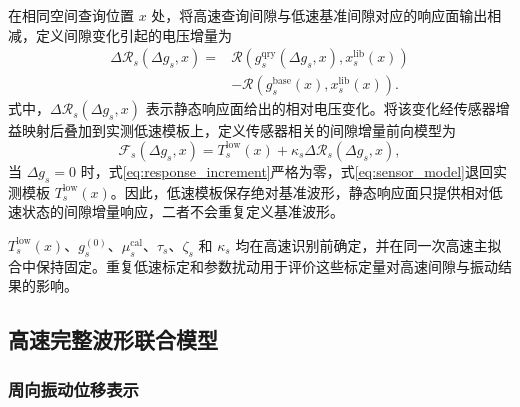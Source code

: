 \documentclass[UTF8,12pt,a4paper]{ctexart}
\newcommand{\Rcal}{\mathcal{R}}
\newcommand{\Fsen}{\mathcal{F}}
\begin{document}
在相同空间查询位置 $x$ 处，将高速查询间隙与低速基准间隙对应的响应面输出相减，定义间隙变化引起的电压增量为
\begin{align}
\Delta\Rcal_s(\Delta g_s,x)
={}&\Rcal\!\left(
g_s^{\mathrm{qry}}(\Delta g_s,x),
x_s^{\mathrm{lib}}(x)
\right)
\nonumber\\
&-\Rcal\!\left(
g_s^{\mathrm{base}}(x),
x_s^{\mathrm{lib}}(x)
\right).
\label{eq:response_increment}
\end{align}
式中，$\Delta\Rcal_s(\Delta g_s,x)$ 表示静态响应面给出的相对电压变化。将该变化经传感器增益映射后叠加到实测低速模板上，定义传感器相关的间隙增量前向模型为
\begin{equation}
\Fsen_s(\Delta g_s,x)
=T_s^{\mathrm{low}}(x)
+\kappa_s\Delta\Rcal_s(\Delta g_s,x),
\label{eq:sensor_model}
\end{equation}
当 $\Delta g_s=0$ 时，式\eqref{eq:response_increment}严格为零，式\eqref{eq:sensor_model}退回实测模板 $T_s^{\mathrm{low}}(x)$。因此，低速模板保存绝对基准波形，静态响应面只提供相对低速状态的间隙增量响应，二者不会重复定义基准波形。

$T_s^{\mathrm{low}}(x)$、$g_s^{(0)}$、$\mu_s^{\mathrm{cal}}$、$\tau_s$、$\zeta_s$ 和 $\kappa_s$ 均在高速识别前确定，并在同一次高速主拟合中保持固定。重复低速标定和参数扰动用于评价这些标定量对高速间隙与振动结果的影响。

\subsection{高速完整波形联合模型}

\subsubsection{周向振动位移表示}
\end{document}
